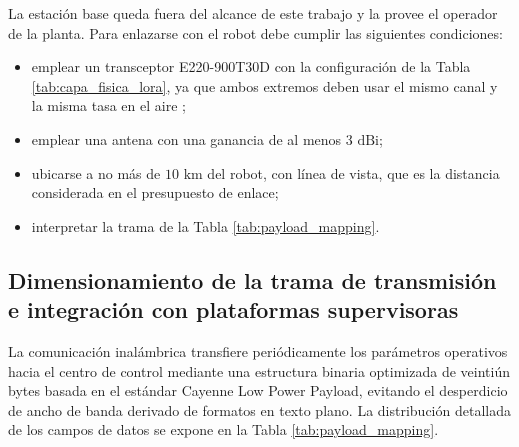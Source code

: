 \documentclass[../../General.tex]{subfiles}
\begin{document}
La estación base queda fuera del alcance de este trabajo y la provee el operador de la planta. Para enlazarse con el robot debe cumplir las siguientes condiciones:
\begin{itemize}
    \item emplear un transceptor E220-900T30D con la configuración de la Tabla \ref{tab:capa_fisica_lora}, ya que ambos extremos deben usar el mismo canal y la misma tasa en el aire \citep{ebyte_e220_900t30d};
    \item emplear una antena con una ganancia de al menos $3\text{ dBi}$;
    \item ubicarse a no más de $10\text{ km}$ del robot, con línea de vista, que es la distancia considerada en el presupuesto de enlace;
    \item interpretar la trama de la Tabla \ref{tab:payload_mapping}.
\end{itemize}

\subsection{Dimensionamiento de la trama de transmisión e integración con plataformas supervisoras}

La comunicación inalámbrica transfiere periódicamente los parámetros operativos hacia el centro de control mediante una estructura binaria optimizada de veintiún bytes basada en el estándar Cayenne Low Power Payload, evitando el desperdicio de ancho de banda derivado de formatos en texto plano. La distribución detallada de los campos de datos se expone en la Tabla \ref{tab:payload_mapping}.
\end{document}
